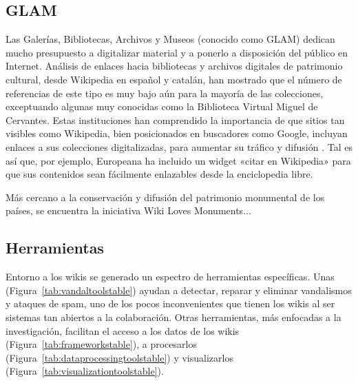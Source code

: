 \documentclass[11pt,onecolumn]{article}
\begin{document}
\subsection{GLAM}


Las Galerías, Bibliotecas, Archivos y Museos (conocido como GLAM) dedican mucho presupuesto a digitalizar material y a ponerlo a disposición del público en Internet. Análisis de enlaces hacia bibliotecas y archivos digitales de patrimonio cultural, desde Wikipedia en español y catalán, han mostrado que el número de referencias de este tipo es muy bajo aún para la mayoría de las colecciones, exceptuando algunas muy conocidas como la Biblioteca Virtual Miguel de Cervantes\citep{saorin2012}. Estas instituciones han comprendido la importancia de que sitios tan visibles como Wikipedia, bien posicionados en buscadores como Google, incluyan enlaces a sus colecciones digitalizadas, para aumentar su tráfico y difusión \citep{lally2007} \citep{elder2012}. Tal es así que, por ejemplo, Europeana ha incluido un widget «citar en Wikipedia» para que sus contenidos sean fácilmente enlazables desde la enciclopedia libre.




Más cercano a la conservación y difusión del patrimonio monumental de los países, se encuentra la iniciativa Wiki Loves Monuments...




\subsection{Herramientas}


Entorno a los wikis se generado un espectro de herramientas específicas. Unas (Figura~\ref{tab:vandaltoolstable}) ayudan a detectar, reparar y eliminar vandalismos y ataques de spam, uno de los pocos inconvenientes que tienen los wikis al ser sistemas tan abiertos a la colaboración. Otras herramientas, más enfocadas a la investigación, facilitan el acceso a los datos de los wikis (Figura~\ref{tab:frameworkstable}), a procesarlos (Figura~\ref{tab:dataprocessingtoolstable}) y visualizarlos (Figura~\ref{tab:visualizationtoolstable}).
\end{document}
